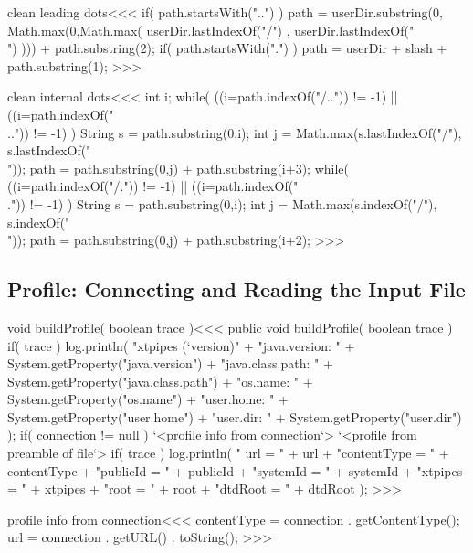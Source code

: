 \documentclass{article}
\begin{document}
\<clean leading dots\><<<
  if( path.startsWith("..") ){  
     path = userDir.substring(0, 
               Math.max(0,Math.max( 
                 userDir.lastIndexOf("/") 
                 , 
                 userDir.lastIndexOf("\\") 
               ))) 
            + path.substring(2);  
  }  
  if( path.startsWith(".") ){  
     path = userDir + slash + path.substring(1);  
  }  
>>>

\<clean internal dots\><<<
  int i; 
  while(  
    ((i=path.indexOf("/..")) != -1)  
    || 
    ((i=path.indexOf("\\..")) != -1)  
  ){ 
    String s = path.substring(0,i); 
    int j = Math.max(s.lastIndexOf("/"), s.lastIndexOf("\\")); 
    path = path.substring(0,j) + path.substring(i+3); 
  } 
  while(  
    ((i=path.indexOf("/.")) != -1)  
    || 
    ((i=path.indexOf("\\.")) != -1)  
  ){ 
    String s = path.substring(0,i); 
    int j = Math.max(s.indexOf("/"), s.indexOf("\\")); 
    path = path.substring(0,j) + path.substring(i+2); 
  } 
>>>



\subsection{Profile: Connecting and Reading the Input File}

\<void buildProfile( boolean trace )\><<<
public void buildProfile( boolean trace ){
   if( trace ){
      log.println(
         "xtpipes (`version)"
         + "\n   java.version: "    + System.getProperty("java.version")  
         + "\n   java.class.path: " + System.getProperty("java.class.path")  
         + "\n   os.name: "         + System.getProperty("os.name")  
         + "\n   user.home: "       + System.getProperty("user.home")  
         + "\n   user.dir: "        + System.getProperty("user.dir")  
           );
   }
   if( connection != null ){ 
     `<profile info from connection`>
   }
   `<profile from preamble of file`>
   if( trace ){
      log.println(
           " url = "           + url 
         + "\n contentType = " + contentType
         + "\n publicId = "    + publicId 
         + "\n systemId = "    + systemId
         + "\n xtpipes = "     + xtpipes
         + "\n root = "        + root
         + "\n dtdRoot = "     + dtdRoot
      ); 
}  }
>>>


\<profile info from connection\><<< 
contentType = connection . getContentType(); 
url = connection . getURL() . toString();
>>> 
\end{document}
